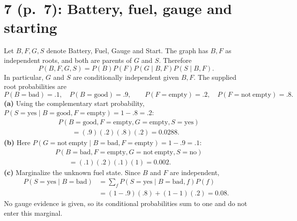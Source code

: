 \documentclass[11pt,a4paper]{article}
\begin{document}
\section*{7 (p.\ 7): Battery, fuel, gauge and starting}
Let $B,F,G,S$ denote Battery, Fuel, Gauge and Start. The graph has
$B,F$ as independent roots, and both are parents of $G$ and $S$. Therefore
\[
 \boxed{P(B,F,G,S)=P(B)P(F)P(G\mid B,F)P(S\mid B,F)}.
\]
In particular, $G$ and $S$ are conditionally independent given $B,F$.
The supplied root probabilities are
\[
 P(B=\mathrm{bad})=.1,\quad P(B=\mathrm{good})=.9,\qquad
 P(F=\mathrm{empty})=.2,\quad P(F=\mathrm{not\ empty})=.8.
\]
\textbf{(a)} Using the complementary start probability,
$P(S=\mathrm{yes}\mid B=\mathrm{good},F=\mathrm{empty})=1-.8=.2$:
\[
\begin{aligned}
&P(B=\mathrm{good},F=\mathrm{empty},G=\mathrm{empty},S=\mathrm{yes})\\
&\qquad=(.9)(.2)(.8)(.2)=\boxed{0.0288}.
\end{aligned}
\]
\textbf{(b)} Here
$P(G=\mathrm{not\ empty}\mid B=\mathrm{bad},F=\mathrm{empty})=1-.9=.1$:
\[
\begin{aligned}
&P(B=\mathrm{bad},F=\mathrm{empty},G=\mathrm{not\ empty},S=\mathrm{no})\\
&\qquad=(.1)(.2)(.1)(1)=\boxed{0.002}.
\end{aligned}
\]
\textbf{(c)} Marginalize the unknown fuel state. Since $B$ and $F$ are independent,
\[
\begin{aligned}
 P(S=\mathrm{yes}\mid B=\mathrm{bad})
 &=\sum_fP(S=\mathrm{yes}\mid B=\mathrm{bad},f)P(f)\\
 &=(1-.9)(.8)+(1-1)(.2)=\boxed{0.08}.
\end{aligned}
\]
No gauge evidence is given, so its conditional probabilities sum to one
and do not enter this marginal.
\end{document}
